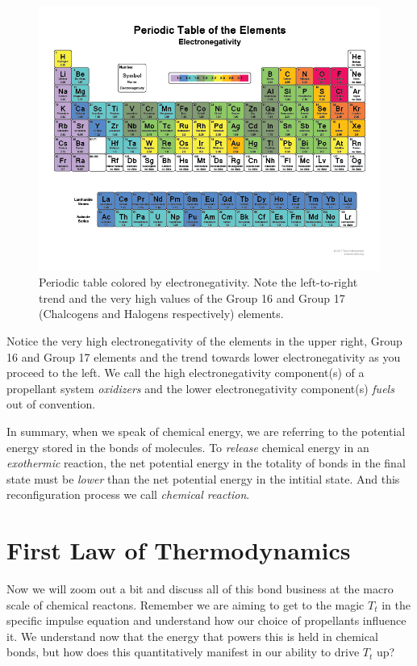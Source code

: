\documentclass[twocolumn]{memoir} %
\begin{document}
\begin{figure}[H]
    \includegraphics[width=\columnwidth]{PeriodicTableElectronegativity.png}
    \caption{Periodic table colored by electronegativity.  Note the left-to-right trend and the very
    high values of the Group 16 and Group 17 (Chalcogens and Halogens respectively) elements.}
    \label{fig:electronegativity}
\end{figure}

Notice the very high electronegativity of the elements in the upper right, Group 16 and Group 17 elements and
the trend towards lower electronegativity as you proceed to the left.  We call the high electronegativity 
component(s) of a propellant system \emph{oxidizers} and the lower electronegativity component(s) \emph{fuels} 
out of convention.

In summary, when we speak of chemical energy, we are referring to the potential energy stored in the bonds of 
molecules.  To \emph{release} chemical energy in an \emph{exothermic} reaction, the net potential energy in 
the totality of bonds in the final state must be \emph{lower} than the net potential energy in the intitial state.
And this reconfiguration process we call \emph{chemical reaction}.

\section{First Law of Thermodynamics}

Now we will zoom out a bit and discuss all of this bond business at the macro scale of chemical reactons.  Remember
we are aiming to get to the magic $T_t$ in the specific impulse equation and understand how our choice of
propellants influence it.  We understand now that the energy that powers this is held in chemical bonds, but how
does this quantitatively manifest in our ability to drive $T_t$ up?
\end{document}
